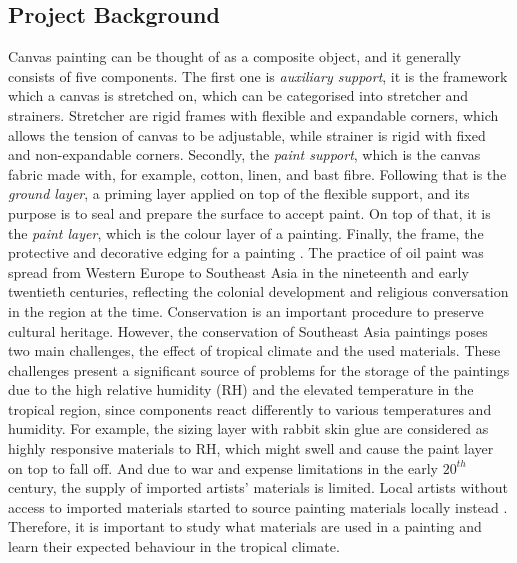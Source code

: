 \documentclass[11pt, oneside]{article}
\begin{document}
\subsection{Project Background}
Canvas painting can be thought of as a composite object, and it generally consists of five components. The first one is \textit{auxiliary support}, it is the framework which a canvas is stretched on, which can be categorised into stretcher and strainers. Stretcher are rigid frames with flexible and expandable corners, which allows the tension of canvas to be adjustable, while strainer is rigid with fixed and non-expandable corners. Secondly, the \textit{paint support}, which is the canvas fabric made with, for example, cotton, linen, and bast fibre. Following that is the \textit{ground layer}, a priming layer applied on top of the flexible support, and its purpose is to seal and prepare the surface to accept paint. On top of that, it is the \textit{paint layer}, which is the colour layer of a painting. Finally, the frame, the protective and decorative edging for a painting \cite{tse2008southeastlayers}.
\bigbreak
\noindent The practice of oil paint was spread from Western Europe to Southeast Asia in the nineteenth and early twentieth centuries, reflecting the colonial development and religious conversation in the region at the time. Conservation is an important procedure to preserve cultural heritage. However, the conservation of Southeast Asia paintings poses two main challenges, the effect of tropical climate and the used materials. These challenges present a significant source of problems for the storage of the paintings due to the high relative humidity (RH) and the elevated temperature in the tropical region, since components react differently to various temperatures and humidity. For example, the sizing layer with rabbit skin glue are considered as highly responsive materials to RH, which might swell and cause the paint layer on top to fall off. And due to war and expense limitations in the early $20^{th}$ century, the supply of imported artists’ materials is limited. Local artists without access to imported materials started to source painting materials locally instead \cite{inbook}. Therefore, it is important to study what materials are used in a painting and learn their expected behaviour in the tropical climate.
\end{document}
